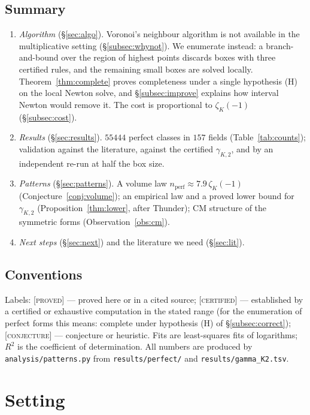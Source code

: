 \documentclass[11pt]{amsart}
\theoremstyle{definition}
\theoremstyle{remark}
\newcommand{\gK}{\gamma_{K,2}}
\newcommand{\nperf}{n_{\mathrm{perf}}}
\newcommand{\PROVED}{\textsc{[proved]}}
\newcommand{\CERT}{\textsc{[certified]}}
\newcommand{\CONJ}{\textsc{[conjecture]}}
\begin{document}
\subsection*{Summary}
\begin{enumerate}[leftmargin=*]
\item \emph{Algorithm} (\S\ref{sec:algo}).  Voronoi's neighbour algorithm is not available in
the multiplicative setting (\S\ref{subsec:whynot}).  We enumerate instead: a branch-and-bound
over the region of highest points discards boxes with three certified rules, and the
remaining small boxes are solved locally.  Theorem~\ref{thm:complete} proves completeness
under a single hypothesis (H) on the local Newton solve, and \S\ref{subsec:improve} explains how
interval Newton would remove it.  The cost is proportional to $\zeta_K(-1)$
(\S\ref{subsec:cost}).
\item \emph{Results} (\S\ref{sec:results}).  $55444$ perfect classes in $157$ fields
(Table~\ref{tab:counts}); validation against the literature, against the certified $\gK$, and
by an independent re-run at half the box size.
\item \emph{Patterns} (\S\ref{sec:patterns}).  A volume law $\nperf\approx 7.9\,\zeta_K(-1)$
(Conjecture~\ref{conj:volume}); an empirical law and a proved lower bound for $\gK$
(Proposition~\ref{thm:lower}, after Thunder); CM structure of the symmetric forms (Observation~\ref{obs:cm}).
\item \emph{Next steps} (\S\ref{sec:next}) and the literature we need (\S\ref{sec:lit}).
\end{enumerate}

\subsection*{Conventions}
Labels: \PROVED{} --- proved here or in a cited source; \CERT{} --- established by a
certified or exhaustive computation in the stated range (for the enumeration of perfect forms
this means: complete under hypothesis (H) of \S\ref{subsec:correct}); \CONJ{} --- conjecture
or heuristic.  Fits are least-squares fits of logarithms; $R^2$ is the coefficient of
determination.  All numbers are produced by \texttt{analysis/patterns.py} from
\texttt{results/perfect/} and \texttt{results/gamma\_K2.tsv}.

\section{Setting}\label{sec:setting}
\end{document}
